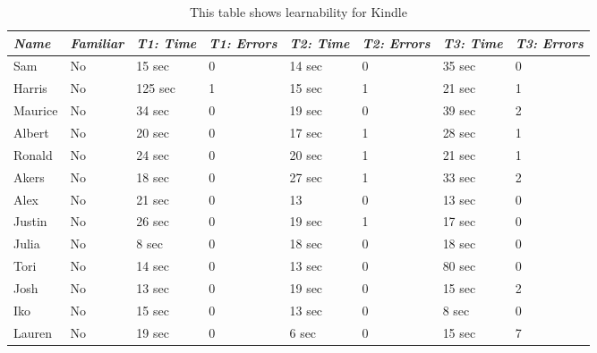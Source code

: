 \documentclass[12pt,letterpaper]{article}
\begin{document}
    \begin{table}
        \centering
        \begin{tabular}{|l|l|l|l|l|l|l|l|}
            \hline
            \emph{Name} & \emph{Familiar} & \emph{T1: Time} & \emph{T1: Errors} & \emph{T2: Time} & \emph{T2: Errors} & \emph{T3: Time} & \emph{T3: Errors} \\
            \hline
            Sam & No & 15 sec & 0 & 14 sec & 0 & 35 sec & 0 \\
            \hline
            Harris & No & 125 sec & 1 & 15 sec & 1 & 21 sec & 1 \\
            \hline
            Maurice & No & 34 sec & 0 & 19 sec & 0 & 39 sec & 2 \\
            \hline
            Albert & No & 20 sec & 0 & 17 sec & 1 & 28 sec & 1 \\
            \hline
            Ronald & No & 24 sec & 0 & 20 sec & 1 & 21 sec & 1 \\
            \hline
            Akers & No & 18 sec & 0 & 27 sec & 1 & 33 sec & 2 \\
            \hline
            Alex & No & 21 sec & 0 & 13 & 0 & 13 sec & 0 \\
            \hline
            Justin & No & 26 sec & 0 & 19 sec & 1 & 17 sec & 0 \\
            \hline
            Julia & No & 8 sec & 0 & 18 sec & 0 & 18 sec & 0 \\
            \hline
            Tori & No & 14 sec & 0 & 13 sec & 0 & 80 sec & 0 \\
            \hline
            Josh & No & 13 sec & 0 & 19 sec & 0 & 15 sec & 2 \\
            \hline
            Iko & No & 15 sec & 0 & 13 sec & 0 & 8 sec & 0 \\
            \hline
            Lauren & No & 19 sec & 0 & 6 sec & 0 & 15 sec & 7 \\
        \end{tabular}
        \caption{This table shows learnability for Kindle}
    \end{table}
\end{document}
